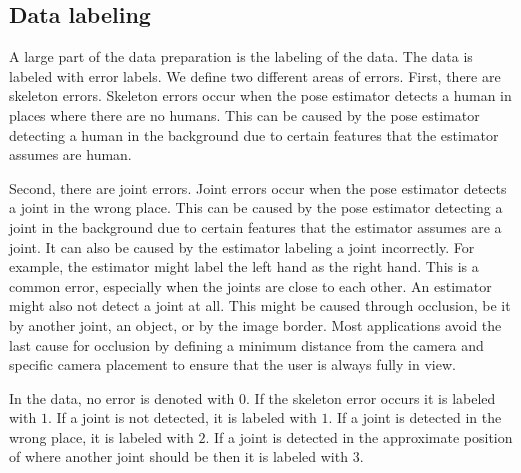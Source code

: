 \subsection{Data labeling}
\label{sec:data_labeling}

A large part of the data preparation is the labeling of the data. The data is labeled with error labels. We define two different areas of errors. First, there are skeleton errors. Skeleton errors occur when the pose estimator detects a human in places where there are no humans. This can be caused by the pose estimator detecting a human in the background due to certain features that the estimator assumes are human.

Second, there are joint errors. Joint errors occur when the pose estimator detects a joint in the wrong place. This can be caused by the pose estimator detecting a joint in the background due to certain features that the estimator assumes are a joint. It can also be caused by the estimator labeling a joint incorrectly. For example, the estimator might label the left hand as the right hand. This is a common error, especially when the joints are close to each other. An estimator might also not detect a joint at all. This might be caused through occlusion, be it by another joint, an object, or by the image border. Most applications avoid the last cause for occlusion by defining a minimum distance from the camera and specific camera placement to ensure that the user is always fully in view.

In the data, no error is denoted with $0$. If the skeleton error occurs it is labeled with $1$. If a joint is not detected, it is labeled with $1$. If a joint is detected in the wrong place, it is labeled with $2$. If a joint is detected in the approximate position of where another joint should be then it is labeled with $3$.